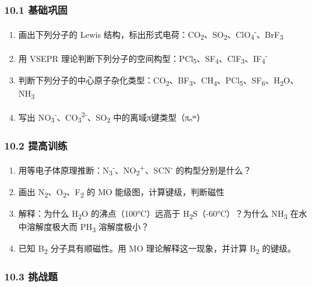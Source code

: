 \documentclass[a4paper,11pt]{ctexart}
\providecommand{\tightlist}{\setlength{\itemsep}{0pt}\setlength{\parskip}{0pt}}
\begin{document}
\subsubsection{10.1 基础巩固}\label{ux57faux7840ux5de9ux56fa}

\begin{enumerate}
\def\labelenumi{\arabic{enumi}.}
\tightlist
\item
  画出下列分子的 Lewis 结构，标出形式电荷：CO\textsubscript{2}、SO\textsubscript{2}、ClO\textsubscript{4}\textsuperscript{-}、BrF\textsubscript{3}
\item
  用 VSEPR 理论判断下列分子的空间构型：PCl\textsubscript{5}、SF\textsubscript{4}、ClF\textsubscript{3}、IF\textsubscript{4}\textsuperscript{-}
\item
  判断下列分子的中心原子杂化类型：CO\textsubscript{2}、BF\textsubscript{3}、CH\textsubscript{4}、PCl\textsubscript{5}、SF\textsubscript{6}、H\textsubscript{2}O、NH\textsubscript{3}
\item
  写出 NO\textsubscript{3}\textsuperscript{-}、CO\textsubscript{3}\textsuperscript{2-}、SO\textsubscript{2} 中的离域π键类型（πₙᵐ）
\end{enumerate}

\subsubsection{10.2 提高训练}\label{ux63d0ux9ad8ux8badux7ec3}

\begin{enumerate}
\def\labelenumi{\arabic{enumi}.}
\setcounter{enumi}{4}
\tightlist
\item
  用等电子体原理推断：N\textsubscript{3}\textsuperscript{-}、NO\textsubscript{2}\textsuperscript{+}、SCN\textsuperscript{-} 的构型分别是什么？
\item
  画出 N\textsubscript{2}、O\textsubscript{2}、F\textsubscript{2} 的 MO 能级图，计算键级，判断磁性
\item
  解释：为什么 H\textsubscript{2}O 的沸点（100°C）远高于 H\textsubscript{2}S（-60°C）？为什么 NH\textsubscript{3} 在水中溶解度极大而 PH\textsubscript{3} 溶解度极小？
\item
  已知 B\textsubscript{2} 分子具有顺磁性。用 MO 理论解释这一现象，并计算 B\textsubscript{2} 的键级。
\end{enumerate}

\subsubsection{10.3 挑战题}\label{ux6311ux6218ux9898}
\end{document}
